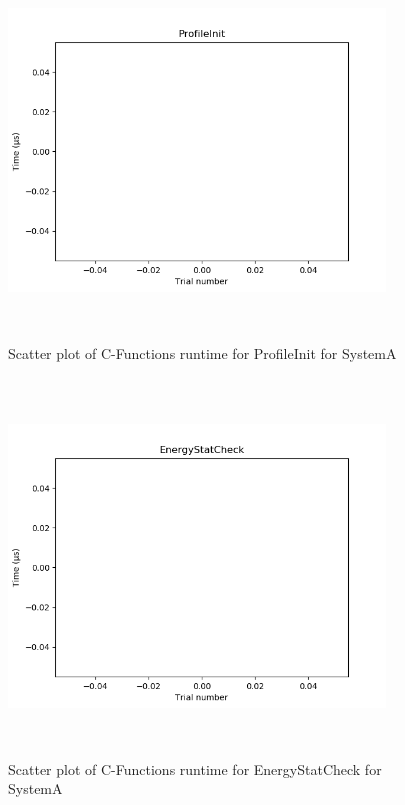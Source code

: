 \documentclass{article}
\begin{document}
\begin{figure}[H]
	\centering
	\includegraphics[width=10cm,height=10cm,keepaspectratio]{RuntimeResults_SystemA/CFunctions/ProfileInit_scatter.png}
	\caption{Scatter plot of C-Functions runtime for ProfileInit for SystemA}
	\label{fig:C-Functions|ProfileInit|SystemA}
\end{figure}

\begin{figure}[H]
	\centering
	\includegraphics[width=10cm,height=10cm,keepaspectratio]{RuntimeResults_SystemA/CFunctions/EnergyStatCheck_scatter.png}
	\caption{Scatter plot of C-Functions runtime for EnergyStatCheck for SystemA}
	\label{fig:C-Functions|EnergyStatCheck|SystemA}
\end{figure}
\end{document}
